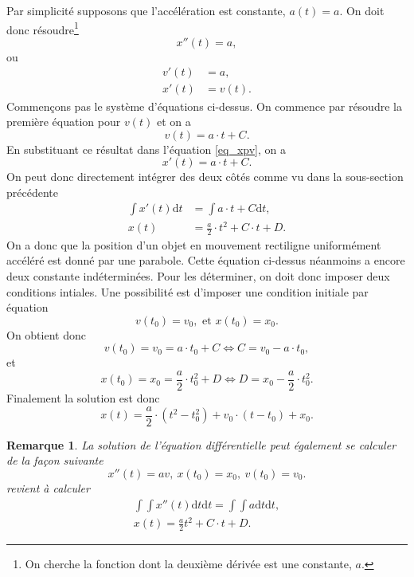 \documentclass[a4paper,12pt]{book}
\newcommand{\dd}{\mathrm{d}}
\renewcommand{\eqref}[1]{\ref{#1}}
\newtheorem*{remarque}{Remarque}
\begin{document}
Par simplicité supposons que l'accélération est constante, $a(t)=a$. On doit donc résoudre\footnote{On cherche la fonction dont la deuxième dérivée est une constante, $a$.}
\begin{equation}
x''(t)=a,
\end{equation}
ou 
\begin{align}
v'(t)&=a,\\
x'(t)&=v(t).\label{eq_xpv}
\end{align}
Commen\c cons pas le système d'équations ci-dessus. On commence par résoudre 
la première équation pour $v(t)$ et on a
\begin{equation}
 v(t)=a\cdot t+C.
\end{equation}
En substituant ce résultat dans l'équation \eqref{eq_xpv}, on a
\begin{equation}
 x'(t)=a\cdot t+C.
\end{equation}
On peut donc directement intégrer des deux côtés comme vu dans la sous-section précédente
\begin{align}
 \int x'(t)\dd t&=\int a\cdot t+C\dd t,\nonumber\\
 x(t)&=\frac{a}{2}\cdot t^2+C\cdot t + D.
\end{align}
On a donc que la position d'un objet en mouvement rectiligne uniformément accéléré est donné par une
parabole. Cette équation ci-dessus néanmoins a encore deux constante indéterminées. Pour les déterminer, on doit donc imposer
deux conditions intiales. Une possibilité est d'imposer une condition initiale par équation
\begin{equation}
 v(t_0)=v_0,\mbox{ et } x(t_0)=x_0.
\end{equation}
On obtient donc 
\begin{equation}
 v(t_0)=v_0=a\cdot t_0+C \Leftrightarrow C=v_0-a\cdot t_0,
\end{equation}
et
\begin{equation}
 x(t_0)=x_0=\frac{a}{2}\cdot t_0^2+D \Leftrightarrow D=x_0-\frac{a}{2}\cdot t_0^2.
\end{equation}
Finalement la solution est donc
\begin{equation}
 x(t)=\frac{a}{2}\cdot (t^2-t_0^2)+v_0\cdot (t-t_0)+x_0.
\end{equation}

\begin{remarque}
La solution de l'équation différentielle peut également se calculer de la façon suivante
\begin{equation}
 x''(t)=av,\ x(t_0)=x_0,\ v(t_0)=v_0.
\end{equation}
revient à calculer 
\begin{align*}
 \int \int x''(t)\dd t\dd t=\int \int a \dd t\dd t,\\
 x(t)=\frac{a}{2}t^2+C\cdot t + D.
\end{align*}
\end{remarque}
\end{document}
